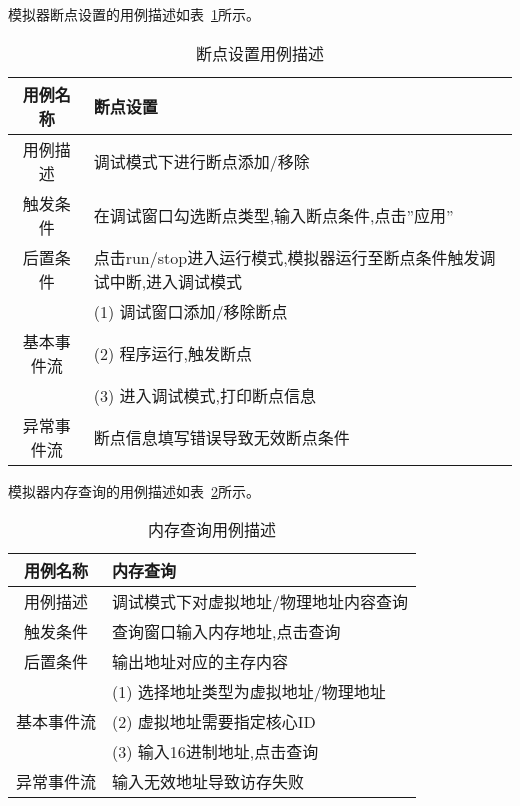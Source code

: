 模拟器断点设置的用例描述如表~\ref{tab:yongli3}所示。
\begin{table}[H]
  \centering
  \caption{断点设置用例描述}
  \label{tab:yongli3}
  \renewcommand\arraystretch{1.1}
  \begin{tabular}{cl}
    \toprule
用例名称	& 断点设置\\
    \midrule
用例描述	& \multicolumn{1}{p{9cm}}{调试模式下进行断点添加/移除}\\ \hline
触发条件	& \multicolumn{1}{m{9cm}}{在调试窗口勾选断点类型,输入断点条件,点击”应用”}\\ \hline
后置条件	& \multicolumn{1}{m{9cm}}{点击run/stop进入运行模式,模拟器运行至断点条件触发调试中断,进入调试模式}\\ \hline
 & \multicolumn{1}{m{9cm}}{(1)	调试窗口添加/移除断点}\\
 基本事件流 & \multicolumn{1}{m{9cm}}{(2)	程序运行,触发断点}\\
 & \multicolumn{1}{m{9cm}}{(3)	进入调试模式,打印断点信息}\\ \hline
异常事件流	& \multicolumn{1}{m{9cm}}{断点信息填写错误导致无效断点条件}\\
    \bottomrule
  \end{tabular}
\end{table}


模拟器内存查询的用例描述如表~\ref{tab:yongli4}所示。
\begin{table}[H]
  \centering
  \caption{内存查询用例描述}
  \label{tab:yongli4}
  \renewcommand\arraystretch{1.1}
  \begin{tabular}{cl}
    \toprule
用例名称	& 内存查询\\
    \midrule
用例描述	& \multicolumn{1}{p{9cm}}{调试模式下对虚拟地址/物理地址内容查询}\\ \hline
触发条件	& \multicolumn{1}{p{9cm}}{查询窗口输入内存地址,点击查询}\\ \hline
后置条件	& \multicolumn{1}{p{9cm}}{输出地址对应的主存内容}\\ \hline
	& \multicolumn{1}{p{9cm}}{(1) 选择地址类型为虚拟地址/物理地址}\\
  基本事件流 &            \multicolumn{1}{p{9cm}}{(2) 虚拟地址需要指定核心ID}\\
 &            \multicolumn{1}{p{9cm}}{(3) 输入16进制地址,点击查询}\\ \hline
异常事件流	& \multicolumn{1}{p{9cm}}{输入无效地址导致访存失败}\\
    \bottomrule
  \end{tabular}
\end{table}


